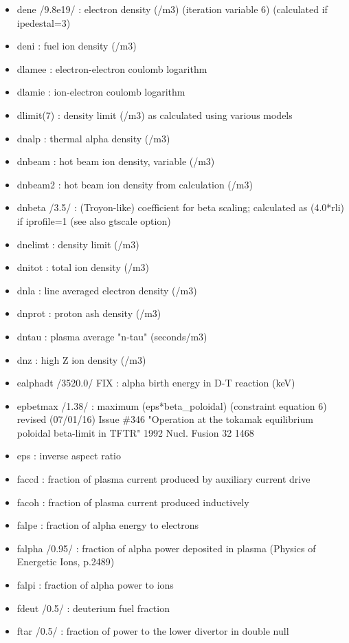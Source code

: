 \documentclass[]{article}
\begin{document}
\begin{itemize}
\item
  dene /9.8e19/ : electron density (/m3) (iteration variable 6)
  (calculated if ipedestal=3)
\item
  deni : fuel ion density (/m3)
\item
  dlamee : electron-electron coulomb logarithm
\item
  dlamie : ion-electron coulomb logarithm
\item
  dlimit(7) : density limit (/m3) as calculated using various models
\item
  dnalp : thermal alpha density (/m3)
\item
  dnbeam : hot beam ion density, variable (/m3)
\item
  dnbeam2 : hot beam ion density from calculation (/m3)
\item
  dnbeta /3.5/ : (Troyon-like) coefficient for beta scaling; calculated
  as (4.0*rli) if iprofile=1 (see also gtscale option)
\item
  dnelimt : density limit (/m3)
\item
  dnitot : total ion density (/m3)
\item
  dnla : line averaged electron density (/m3)
\item
  dnprot : proton ash density (/m3)
\item
  dntau : plasma average "n-tau" (seconds/m3)
\item
  dnz : high Z ion density (/m3)
\item
  ealphadt /3520.0/ FIX : alpha birth energy in D-T reaction (keV)
\item
  epbetmax /1.38/ : maximum (eps*beta\_poloidal) (constraint equation 6)
  revised (07/01/16) Issue \#346 "Operation at the tokamak equilibrium
  poloidal beta-limit in TFTR" 1992 Nucl. Fusion 32 1468
\item
  eps : inverse aspect ratio
\item
  faccd : fraction of plasma current produced by auxiliary current drive
\item
  facoh : fraction of plasma current produced inductively
\item
  falpe : fraction of alpha energy to electrons
\item
  falpha /0.95/ : fraction of alpha power deposited in plasma (Physics
  of Energetic Ions, p.2489)
\item
  falpi : fraction of alpha power to ions
\item
  fdeut /0.5/ : deuterium fuel fraction
\item
  ftar /0.5/ : fraction of power to the lower divertor in double null

\end{itemize}
\end{document}
